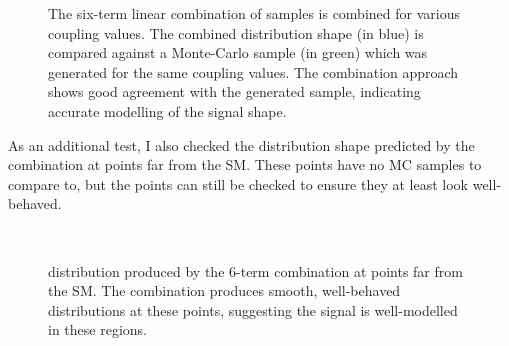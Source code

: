     \begin{figure}
    	\centering
        \caption{
            The six-term linear combination of samples is combined for various coupling values.
            The combined distribution shape (in blue) is compared against a Monte-Carlo sample (in green) which was generated for the same coupling values.
            The combination approach shows good agreement with the generated sample, indicating accurate modelling of the signal shape.
        }
        \label{fig:vbf_hh_validation}
    \end{figure}

    As an additional test, I also checked the distribution shape predicted by the combination at points far from the SM.
    These points have no MC samples to compare to, but the points can still be checked to ensure they at least look well-behaved.

    \begin{figure}
        \\
        \caption{
            \mhh distribution produced by the 6-term combination at points far from the SM.
            The combination produces smooth, well-behaved distributions at these points,
                suggesting the signal is well-modelled in these regions.
        }
        \label{fig:vbf_hh_6term_preview}
    \end{figure}

